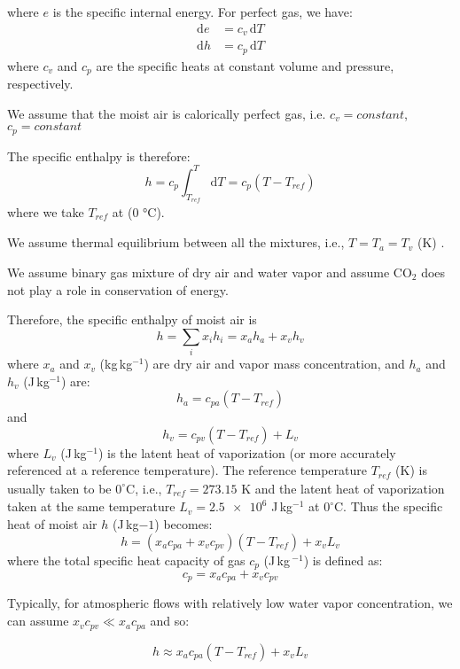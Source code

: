 where $e$ is the specific internal energy. For perfect gas, we have:
\begin{align}
\mathrm{d}e &= c_v \,\mathrm{d}T\\
\mathrm{d}h &= c_p \,\mathrm{d}T
\end{align}
where $c_v$ and $c_p$ are the specific heats at constant volume and pressure, respectively.
\begin{assumption}
	We assume that the moist air is calorically perfect gas, i.e. $c_v=\textit{constant}$, $c_p=\textit{constant}$
\end{assumption}
The specific enthalpy is therefore:
\begin{equation}
h = c_p \int^T_{T_{\textit{ref}}} \mathrm{d}T = c_p \left(T - T_{\textit{ref}}\right)
\end{equation}
where we take $T_{\textit{ref}}$ at ($0$ \si{\degreeCelsius}).
\begin{assumption}
	We assume thermal equilibrium between all the mixtures, i.e., $T = T_a = T_v$ (K) \citep{Defraeye2011}.
\end{assumption}


\begin{assumption}
	We assume binary gas mixture of dry air and water vapor and assume CO$_2$ does not play a role in conservation of energy.
\end{assumption}

Therefore, the specific enthalpy of moist air is 
\begin{equation}
h = \sum_i x_i h_i = x_a h_a + x_v h_v
\end{equation}
where $x_a$ and $x_v$ (kg\,kg$^{-1}$) are dry air and vapor mass concentration, and $h_a$ and $h_v$ (J\,kg$^{-1}$) are:
\begin{equation}
h_a = c_{pa} \left(T - T_{\textit{ref}}\right)
\end{equation}
and 
\begin{equation}
h_v = c_{pv} \left(  T - T_{\textit{ref}}\right) + L_v
\end{equation}
where $L_v$ (J\,kg$^{-1}$) is the latent heat of vaporization (or more accurately referenced at a reference temperature). The reference temperature $T_{\textit{ref}}$ (K) is usually taken to be $0^{\circ}$C, i.e., $T_{\textit{ref}} = 273.15$ K and the latent heat of vaporization taken at the same temperature $L_v = \num{2.5e6}$ J\,kg$^{-1}$ at $0^{\circ}$C. Thus the specific heat of moist air $h$ (J\,kg${-1}$) becomes:
\begin{equation}
h = \left(x_a c_{pa} + x_v c_{pv} \right) \left(T - T_{\textit{ref}}\right)  + x_v L_v
\label{eq:enthalpymoistair}
\end{equation}
where the total specific heat capacity of gas $c_p$ (J\,kg\,$^{-1}$) is defined as:
\begin{equation}
c_p = x_a c_{pa} + x_v c_{pv}
\end{equation}

\begin{assumption}
Typically, for atmospheric flows with relatively low water vapor concentration, we can assume $x_v c_{pv} \ll x_a c_{pa}$ and so: 
\end{assumption}

\begin{equation}
h \approx x_a c_{pa} \left(T - T_{\textit{ref}}\right)  + x_v L_v
\end{equation}


